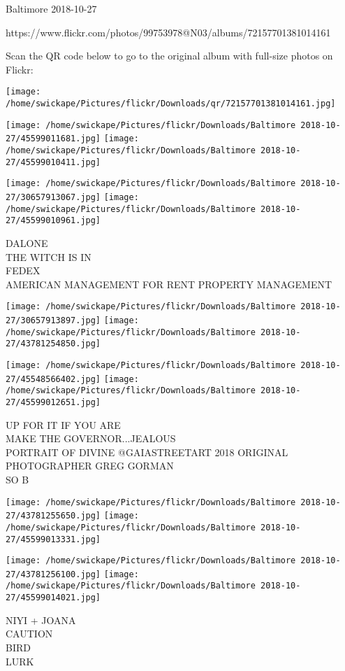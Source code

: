 \documentclass[10pt,letterpaper]{article}
\begin{document}
Baltimore 2018-10-27

https://www.flickr.com/photos/99753978@N03/albums/72157701381014161

Scan the QR code below to go to the original album with full-size photos on Flickr:

\texttt{[image: /home/swickape/Pictures/flickr/Downloads/qr/72157701381014161.jpg]}
\pagebreak

\texttt{[image: /home/swickape/Pictures/flickr/Downloads/Baltimore 2018-10-27/45599011681.jpg]}
\texttt{[image: /home/swickape/Pictures/flickr/Downloads/Baltimore 2018-10-27/45599010411.jpg]}

\texttt{[image: /home/swickape/Pictures/flickr/Downloads/Baltimore 2018-10-27/30657913067.jpg]}
\texttt{[image: /home/swickape/Pictures/flickr/Downloads/Baltimore 2018-10-27/45599010961.jpg]}

DALONE\\
THE WITCH IS IN\\
FEDEX\\
AMERICAN MANAGEMENT FOR RENT PROPERTY MANAGEMENT
\pagebreak

\texttt{[image: /home/swickape/Pictures/flickr/Downloads/Baltimore 2018-10-27/30657913897.jpg]}
\texttt{[image: /home/swickape/Pictures/flickr/Downloads/Baltimore 2018-10-27/43781254850.jpg]}

\texttt{[image: /home/swickape/Pictures/flickr/Downloads/Baltimore 2018-10-27/45548566402.jpg]}
\texttt{[image: /home/swickape/Pictures/flickr/Downloads/Baltimore 2018-10-27/45599012651.jpg]}

UP FOR IT IF YOU ARE\\
MAKE THE GOVERNOR...JEALOUS\\
PORTRAIT OF DIVINE @GAIASTREETART 2018 ORIGINAL PHOTOGRAPHER GREG GORMAN\\
SO B
\pagebreak

\texttt{[image: /home/swickape/Pictures/flickr/Downloads/Baltimore 2018-10-27/43781255650.jpg]}
\texttt{[image: /home/swickape/Pictures/flickr/Downloads/Baltimore 2018-10-27/45599013331.jpg]}

\texttt{[image: /home/swickape/Pictures/flickr/Downloads/Baltimore 2018-10-27/43781256100.jpg]}
\texttt{[image: /home/swickape/Pictures/flickr/Downloads/Baltimore 2018-10-27/45599014021.jpg]}

NIYI + JOANA\\
CAUTION\\
BIRD\\
LURK
\pagebreak
\end{document}
